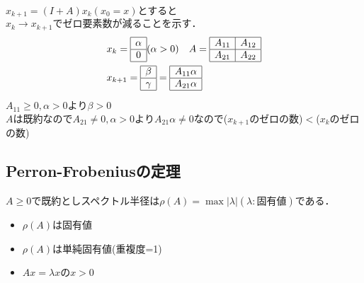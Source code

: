 $x_{k+1}=(I+A)x_k (x_0 =x)$とすると$x_k \to x_{k+1}でゼロ要素数が減ることを示す．$
\begin{align*}
  &x_k =
  \begin{array}{|c|}
     \hline
     \alpha\\\hline
     0\\\hline
  \end{array}(\alpha >0)\ \ \ A=
  \begin{array}{|c|c|}
    \hline
    A_{11} & A_{12}\\\hline
    A_{21} & A_{22}\\\hline
  \end{array}\\
  &x_{k+1}=
  \begin{array}{|c|}
     \hline
     \beta\\\hline
     \gamma\\\hline
  \end{array}=
  \begin{array}{|c|}
    \hline
    A_{11} \alpha\\\hline
    A_{21} \alpha\\\hline
  \end{array}
\end{align*}

$A_{11}\geq 0,\alpha >0より\beta >0$\\
$A$は既約なので$A_{21}\neq 0,\alpha >0よりA_{21}\alpha \neq 0$なので($x_{k+1}$のゼロの数)$<$($x_k$のゼロの数)
\subsection{Perron-Frobeniusの定理}
$A\geq 0$で既約としスペクトル半径は$\rho (A)=\max |\lambda |(\lambda :固有値)$である．
\begin{thm}
  \begin{itemize}
    \item $\rho (A)$は固有値\\
    \item $\rho (A)$は単純固有値(重複度=1)\\
    \item $Ax=\lambda x$の$x>0$
  \end{itemize}
\end{thm}
